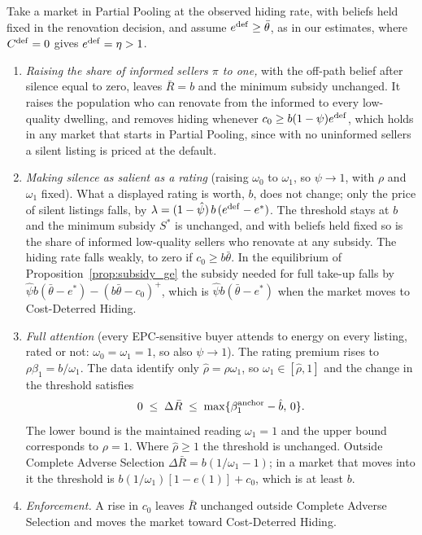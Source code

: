 \label{prop:instruments}
Take a market in Partial Pooling at the observed hiding rate, with beliefs held fixed in the renovation decision, and assume $e^{\rm def}\ge\bar\theta$, as in our estimates, where $C^{\rm def}=0$ gives $e^{\rm def}=\eta>1$.
\begin{enumerate}[label=(\roman*)]
    \item \emph{Raising the share of informed sellers $\pi$ to one,} with the off-path belief after silence equal to zero, leaves $\bar R=b$ and the minimum subsidy unchanged. It raises the population who can renovate from the informed to every low-quality dwelling, and removes hiding whenever $c_0\ge b(1-\psi)e^{\rm def}$, which holds in any market that starts in Partial Pooling, since with no uninformed sellers a silent listing is priced at the default.
    \item \emph{Making silence as salient as a rating} (raising $\omega_0$ to $\omega_1$, so $\psi\to1$, with $\rho$ and $\omega_1$ fixed). What a displayed rating is worth, $b$, does not change; only the price of silent listings falls, by $\lambda=(1-\hat\psi)\,b\,(e^{\rm def}-e^*)$. The threshold stays at $b$ and the minimum subsidy $S^*$ is unchanged, and with beliefs held fixed so is the share of informed low-quality sellers who renovate at any subsidy. The hiding rate falls weakly, to zero if $c_0\ge b\bar\theta$. In the equilibrium of Proposition~\ref{prop:subsidy_ge} the subsidy needed for full take-up falls by $\hat\psi b(\bar\theta-e^*)-(b\bar\theta-c_0)^+$, which is $\hat\psi b(\bar\theta-e^*)$ when the market moves to Cost-Deterred Hiding.
    \item \emph{Full attention} (every EPC-sensitive buyer attends to energy on every listing, rated or not: $\omega_0=\omega_1=1$, so also $\psi\to1$). The rating premium rises to $\rho\beta_1=b/\omega_1$. The data identify only $\hat\rho=\rho\omega_1$, so $\omega_1\in[\hat\rho,1]$ and the change in the threshold satisfies
    \[
        0\;\le\;\Delta\bar R\;\le\;\max\{\beta_1^{\rm anchor}-\hat b,\,0\}.
    \]
    The lower bound is the maintained reading $\omega_1=1$ and the upper bound corresponds to $\rho=1$. Where $\hat\rho\ge1$ the threshold is unchanged. Outside Complete Adverse Selection $\Delta\bar R=b(1/\omega_1-1)$; in a market that moves into it the threshold is $b(1/\omega_1)[1-e(1)]+c_0$, which is at least $b$.
    \item \emph{Enforcement.} A rise in $c_0$ leaves $\bar R$ unchanged outside Complete Adverse Selection and moves the market toward Cost-Deterred Hiding.
\end{enumerate}
